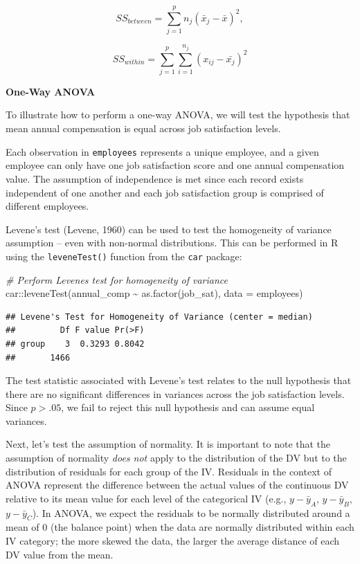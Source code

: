 \documentclass[
]{book}
\newenvironment{Shaded}{\begin{snugshade}}{\end{snugshade}}
\newcommand{\AttributeTok}[1]{\textcolor[rgb]{0.77,0.63,0.00}{#1}}
\newcommand{\CommentTok}[1]{\textcolor[rgb]{0.56,0.35,0.01}{\textit{#1}}}
\newcommand{\FunctionTok}[1]{\textcolor[rgb]{0.00,0.00,0.00}{#1}}
\newcommand{\NormalTok}[1]{#1}
\newcommand{\SpecialCharTok}[1]{\textcolor[rgb]{0.00,0.00,0.00}{#1}}
\begin{document}
\[ SS_{between} = \displaystyle\sum_{j=1}^{p} n_j(\bar{x}_j-\bar{x})^2, \]

\[ SS_{within} = \displaystyle\sum_{j=1}^{p} \displaystyle\sum_{i=1}^{n_j} (x_{ij}-\bar{x_j})^2 \]

\textbf{One-Way ANOVA}

To illustrate how to perform a one-way ANOVA, we will test the hypothesis that mean annual compensation is equal across job satisfaction levels.

Each observation in \texttt{employees} represents a unique employee, and a given employee can only have one job satisfaction score and one annual compensation value. The assumption of independence is met since each record exists independent of one another and each job satisfaction group is comprised of different employees.

Levene's test (Levene, 1960) can be used to test the homogeneity of variance assumption -- even with non-normal distributions. This can be performed in R using the \texttt{leveneTest()} function from the \texttt{car} package:

\begin{Shaded}
\begin{Highlighting}[]
\CommentTok{\# Perform Levene\textquotesingle{}s test for homogeneity of variance}
\NormalTok{car}\SpecialCharTok{::}\FunctionTok{leveneTest}\NormalTok{(annual\_comp }\SpecialCharTok{\textasciitilde{}} \FunctionTok{as.factor}\NormalTok{(job\_sat), }\AttributeTok{data =}\NormalTok{ employees)}
\end{Highlighting}
\end{Shaded}

\begin{verbatim}
## Levene's Test for Homogeneity of Variance (center = median)
##         Df F value Pr(>F)
## group    3  0.3293 0.8042
##       1466
\end{verbatim}

The test statistic associated with Levene's test relates to the null hypothesis that there are no significant differences in variances across the job satisfaction levels. Since \(p > .05\), we fail to reject this null hypothesis and can assume equal variances.

Next, let's test the assumption of normality. It is important to note that the assumption of normality \emph{does not} apply to the distribution of the DV but to the distribution of residuals for each group of the IV. Residuals in the context of ANOVA represent the difference between the actual values of the continuous DV relative to its mean value for each level of the categorical IV (e.g., \(y - \bar{y}_A\), \(y - \bar{y}_B\), \(y - \bar{y}_C\)). In ANOVA, we expect the residuals to be normally distributed around a mean of 0 (the balance point) when the data are normally distributed within each IV category; the more skewed the data, the larger the average distance of each DV value from the mean.
\end{document}
